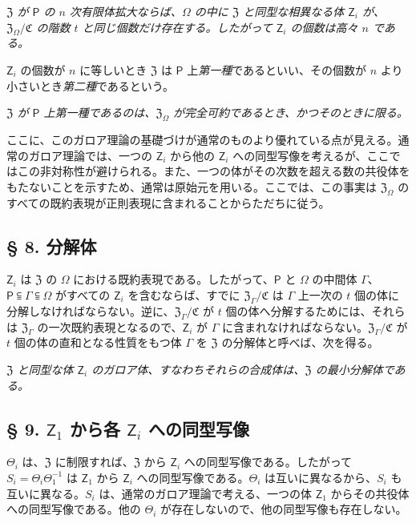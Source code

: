 \emph{$\mathfrak Z$ が $\mathsf P$ の $n$ 次有限体拡大ならば、$\Omega$ の中に $\mathfrak Z$ と同型な相異なる体 $\mathsf{Z}_i$ が、$\mathfrak Z_\Omega/\mathfrak C$ の階数 $t$ と同じ個数だけ存在する。したがって $\mathsf{Z}_i$ の個数は高々 $n$ である。}

$\mathsf{Z}_i$ の個数が $n$ に等しいとき $\mathfrak Z$ は $\mathsf P$ 上\emph{第一種}であるといい、その個数が $n$ より小さいとき\emph{第二種}であるという。

\emph{$\mathfrak Z$ が $\mathsf P$ 上第一種であるのは、$\mathfrak Z_\Omega$ が完全可約であるとき、かつそのときに限る。}

ここに、このガロア理論の基礎づけが通常のものより優れている点が見える。通常のガロア理論では、一つの $\mathsf{Z}_i$ から他の $\mathsf{Z}_i$ への同型写像を考えるが、ここではこの非対称性が避けられる。また、一つの体がその次数を超える数の共役体をもたないことを示すため、通常は原始元を用いる。ここでは、この事実は $\mathfrak Z_\Omega$ のすべての既約表現が正則表現に含まれることからただちに従う。

\subsection*{§ 8. 分解体}\label{der-zerfaellungskoerper}

$\mathsf{Z}_i$ は $\mathfrak Z$ の $\Omega$ における既約表現である。したがって、$\mathsf P$ と $\Omega$ の中間体 $\Gamma$、$\mathsf P\subseteqq\Gamma\subseteqq\Omega$ がすべての $\mathsf{Z}_i$ を含むならば、すでに $\mathfrak Z_\Gamma/\mathfrak C$ は $\Gamma$ 上一次の $t$ 個の体に分解しなければならない。逆に、$\mathfrak Z_\Gamma/\mathfrak C$ が $t$ 個の体へ分解するためには、それらは $\mathfrak Z_\Gamma$ の一次既約表現となるので、$\mathsf{Z}_i$ が $\Gamma$ に含まれなければならない。$\mathfrak Z_\Gamma/\mathfrak C$ が $t$ 個の体の直和となる性質をもつ体 $\Gamma$ を $\mathfrak Z$ の分解体と呼べば、次を得る。

\emph{$\mathfrak Z$ と同型な体 $\mathsf{Z}_i$ のガロア体、すなわちそれらの合成体は、$\mathfrak Z$ の最小分解体である。}

\subsection*{§ 9. $\mathsf{Z}_1$ から各 $\mathsf{Z}_i$ への同型写像}\label{die-isomorphismen-von-z1-auf-die-zi}

$\Theta_i$ は、$\mathfrak Z$ に制限すれば、$\mathfrak Z$ から $\mathsf{Z}_i$ への同型写像である。したがって $S_i=\Theta_i\Theta_1^{-1}$ は $\mathsf{Z}_1$ から $\mathsf{Z}_i$ への同型写像である。$\Theta_i$ は互いに異なるから、$S_i$ も互いに異なる。$S_i$ は、通常のガロア理論で考える、一つの体 $\mathsf{Z}_1$ からその共役体への同型写像である。他の $\Theta_i$ が存在しないので、他の同型写像も存在しない。

